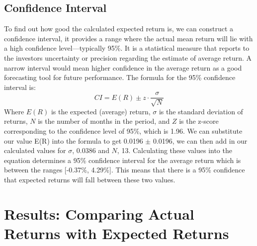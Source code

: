 \documentclass[12]{amsart}
\begin{document}
\begin{flushleft}
\begin{flushleft}
\subsection*{Confidence Interval}
To find out how good the calculated expected return is, we can construct a confidence interval, it provides a range where the actual mean return will lie with a high confidence level—typically 95\%. It is a statistical measure that reports to the investors uncertainty or precision regarding the estimate of average return. A narrow interval would mean higher confidence in the average return as a good forecasting tool for future performance. The formula for the 95\% confidence interval is: \break
\[
CI = E(R) \pm z \cdot \frac{\sigma}{\sqrt{N}}
\]
\newline
Where $E(R)$ is the expected (average) return, $\sigma$ is the standard deviation of returns, $N$ is the number of months in the period, and $Z$ is the z-score corresponding to the confidence level of 95\%, which is 1.96. We can substitute our value E(R) into the formula to get 0.0196 $\pm$ 0.0196, we can then add in our calculated values for $\sigma$, 0.0386 and $N$, 13. Calculating these values into the equation determines a 95\% confidence interval for the average return which is between the ranges [-0.37\%, 4.29\%]. This means that there is a 95\% confidence that expected returns will fall between these two values.

\section{ Results: Comparing Actual Returns with Expected Returns}

\end{flushleft}
\end{flushleft}
\end{document}
